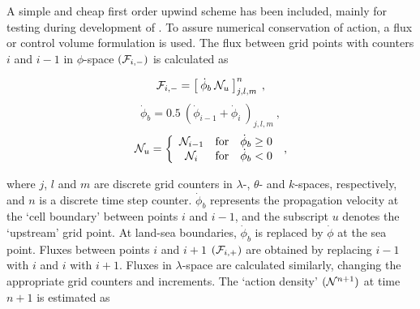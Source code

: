 
\vspace{\baselineskip} 
\vspace{\baselineskip} 


\noindent
A simple and cheap first order upwind scheme has been included, mainly for
testing during development of \ws. To assure numerical conservation of action,
a flux or control volume formulation is used. The flux between grid points
with counters $i$ and $i-1$ in $\phi$-space $({\cal F}_{i,-})$ is calculated as


\begin{equation}
{\cal F}_{i,-} = \left [ \: \dot{\phi}_b \: {\cal N}_u \: \right ]^n_{j,l,m}
\: , \label{eq:1up_xy_1} \end{equation} \begin{equation}
\dot{\phi}_b = 0.5 \: \left ( \dot{\phi}_{i-1} + \dot{\phi}_i 
\: \right )_{j,l,m} \: , \label{eq:1up_xy_2}
\end{equation} \begin{equation}
{\cal N}_u = \left \{ \begin{array}{ccc}
{\cal N}_{i-1} & \mbox{for} & \dot{\phi}_b \geq 0 \\
{\cal N}_i     & \mbox{for} & \dot{\phi}_b   <  0
\end{array} \right . \: , \label{eq:1up_xy_3}
\end{equation}

\noindent
where $j$, $l$ and $m$ are discrete grid counters in $\lambda$-, $\theta$- and
$k$-spaces, respectively, and $n$ is a discrete time step
counter. $\dot{\phi}_b$ represents the propagation velocity at the `cell
boundary' between points $i$ and $i-1$, and the subscript $u$ denotes the
`upstream' grid point. At land-sea boundaries, $\dot{\phi}_b$ is replaced by
$\dot{\phi}$ at the sea point. Fluxes between points $i$ and $i+1$
$({\cal F}_{i,+})$ are obtained by replacing $i-1$ with $i$ and $i$ with
$i+1$. Fluxes in $\lambda$-space are calculated similarly, changing the
appropriate grid counters and increments.  The `action density' $({\cal N}^{n+1})$
at time $n+1$ is estimated as


